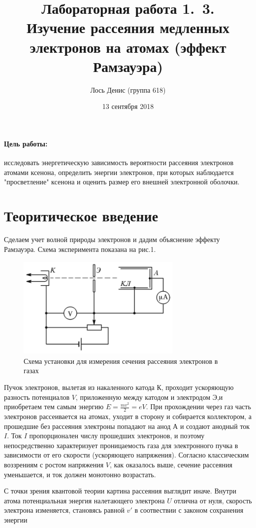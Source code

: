 \documentclass[12pt]{article}
\title{{\bf Лабораторная работа 1.\, 3. \\ Изучение рассеяния медленных электронов на атомах (эффект Рамзауэра)}}
\author{Лось Денис (группа 618)}
\date{13 сентября 2018}
\begin{document}
\maketitle

\paragraph{Цель работы: } исследовать энергетическую зависимость вероятности рассеяния электронов атомами ксенона, определить энергии электронов, при которых наблюдается "просветление" ксенона и оценить размер его внешней электронной оболочки.

\section*{Теоритическое введение}
\par
	Сделаем учет волной природы электронов и дадим объяснение эффекту Рамзауэра. Схема эксперимента показана на рис.1.
\begin{figure}[h!]
	\centering
	\includegraphics[width = 8cm, height = 5cm]{image3.png}
	\caption{Схема установки для измерения сечения рассеяния электронов в газах}
\end{figure}
\par
	Пучок электронов, вылетая из накаленного катода К, проходит ускоряющую разность потенциалов $V$, приложенную между катодом и электродом Э,и приобретаем тем самым энергию $E = \frac{m v^2}{2} = e V$. При прохождении через газ часть электронов рассеивается на атомах, уходит в сторону и собирается коллектором, а прошедшие без рассеяния электроны попадают на анод А и создают анодный ток $I$. Ток $I$ пропорционален числу прошедших электронов, и поэтому непосредственно характеризует проницаемость газа для электронного пучка в зависимости от его скорости (ускоряющего напряжения). Согласно классическим воззрениям с ростом напряжения $V$, как оказалось выше, сечение рассеяния уменьшается, и ток должен монотонно возрастать.
\par
	С точки зрения квантовой теории картина рассеяния выглядит иначе. Внутри атома потенциальная энергия налетающего электрона $U$ отлична от нуля, скорость электрона изменяется, становясь равной $v'$ в соотвествии с законом сохранения энергии
\end{document}
